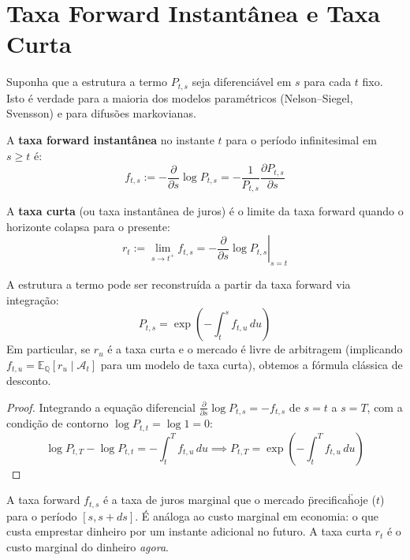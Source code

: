 \section{Taxa Forward Instant\^anea e Taxa Curta}

Suponha que a estrutura a termo $P_{t,s}$ seja diferenci\'avel em
$s$ para cada $t$ fixo. Isto \'e verdade para a maioria dos modelos
param\'etricos (Nelson--Siegel, Svensson) e para difus\~oes
markovianas.

\begin{defi}\label{def:forward_rate}
A \textbf{taxa forward instant\^anea} no instante $t$ para o
per\'iodo infinitesimal em $s \geq t$ \'e:
\[
\boxed{f_{t,s} := -\frac{\partial}{\partial s}\log P_{t,s}
 = -\frac{1}{P_{t,s}}\frac{\partial P_{t,s}}{\partial s}}
\]
\end{defi}

\begin{defi}\label{def:short_rate}
A \textbf{taxa curta} (ou taxa instant\^anea de juros) \'e o limite
da taxa forward quando o horizonte colapsa para o presente:
\[
\boxed{r_t := \lim_{s \to t^+} f_{t,s}
 = -\left.\frac{\partial}{\partial s}\log P_{t,s}\right|_{s=t}}
\]
\end{defi}

\begin{prop}\label{prop:reconstrucao}
A estrutura a termo pode ser reconstru\'ida a partir da taxa forward
via integra\c{c}\~ao:
\[
P_{t,s} = \exp\left(-\int_t^s f_{t,u}\,du\right)
\]
Em particular, se $r_u$ \'e a taxa curta e o mercado \'e livre de
arbitragem (implicando $f_{t,u} = \mathbb{E}_{\mathbb{Q}}[r_u \mid
\mathcal{A}_t]$ para um modelo de taxa curta), obtemos a f\'ormula
cl\'assica de desconto.
\end{prop}

\begin{proof}
Integrando a equa\c{c}\~ao diferencial $\frac{\partial}{\partial s}\log
P_{t,s} = -f_{t,s}$ de $s=t$ a $s=T$, com a condi\c{c}\~ao de contorno
$\log P_{t,t} = \log 1 = 0$:
\[
\log P_{t,T} - \log P_{t,t} = -\int_t^T f_{t,u}\,du
\implies
P_{t,T} = \exp\left(-\int_t^T f_{t,u}\,du\right)
\]
\end{proof}

\begin{obs}
A taxa forward $f_{t,s}$ \'e a taxa de juros marginal que o mercado
\"precifica\" hoje ($t$) para o per\'iodo $[s, s+ds]$. \'E an\'aloga
ao custo marginal em economia: o que custa emprestar dinheiro por
um instante adicional no futuro. A taxa curta $r_t$ \'e o custo
marginal do dinheiro \textit{agora}.
\end{obs}

